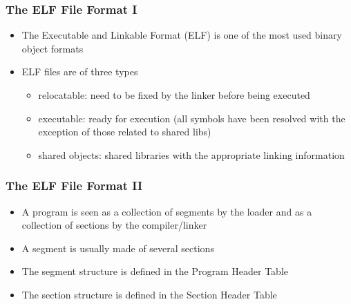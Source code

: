 \documentclass[12pt]{beamer}
\begin{document}
	\begin{frame}
		\frametitle{The ELF File Format I}
		\begin{itemize}
			\item The Executable and Linkable Format (ELF) is one of the most used binary object formats
			\item ELF files are of three types
			\begin{itemize}
				\item relocatable: need to be fixed by the linker before being executed
				\item executable: ready for execution (all symbols have been 
						resolved with the exception of those related to shared libs)
				\item shared objects: shared libraries with the appropriate linking information
			\end{itemize}
		\end{itemize}
	\end{frame}
	
	\begin{frame}
		\frametitle{The ELF File Format II}
		\begin{itemize}
			\item A program is seen as a collection of segments by the loader
			and as a collection of sections by the compiler/linker
			\item A segment is usually made of several sections
			\item The segment structure is defined in the Program Header Table
			\item The section structure is defined in the Section Header Table
		\end{itemize}
	\end{frame}
	
\end{document}
